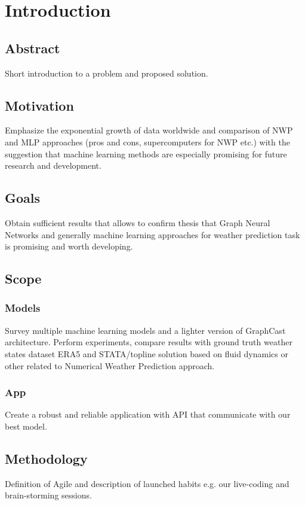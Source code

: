 
\chapter{Introduction}

\section{Abstract}
Short introduction to a problem and proposed solution.

\section{Motivation}
Emphasize the exponential growth of data worldwide and comparison of NWP and MLP approaches (pros and cons, supercomputers for NWP etc.) with the suggestion that machine learning methods are especially promising for future research and development.

\section{Goals}
Obtain sufficient results that allows to confirm thesis that Graph Neural Networks and generally machine learning approaches for weather prediction task is promising and worth developing. 

\section{Scope}

\subsection{Models}
Survey multiple machine learning models and a lighter version of GraphCast architecture. Perform experiments, compare results with ground truth weather states dataset ERA5 and STATA/topline solution based on fluid dynamics or other related to Numerical Weather Prediction approach.

\subsection{App}
Create a robust and reliable application with API that communicate with our best model.

\section{Methodology}
Definition of Agile and description of launched habits e.g. our live-coding and brain-storming sessions. 
